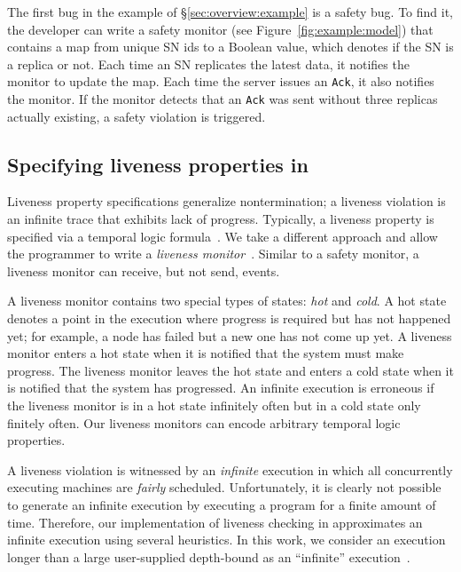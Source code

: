 The first bug in the example of \S\ref{sec:overview:example} is a safety bug. To find it, the developer can write a safety monitor (see Figure~\ref{fig:example:model}) that contains a map from unique SN ids to a Boolean value, which denotes if the SN is a replica or not. Each time an SN replicates the latest data, it notifies the monitor to update the map. Each time the server issues an \texttt{Ack}, it also notifies the monitor. If the monitor detects that an \texttt{Ack} was sent without three replicas actually existing, a safety violation is triggered.

\vspace{-1mm}
\subsection{Specifying liveness properties in \psharp}
\label{sec:overview:liveness}

Liveness property specifications generalize nontermination; a liveness violation is an infinite trace that exhibits lack of progress. Typically, a liveness property is specified via a temporal logic formula~\cite{Pnueli1977, lamport1994temporal}. We take a different approach and allow the programmer to write a \emph{liveness monitor}~\cite{desai2015building}. Similar to a safety monitor, a liveness monitor can receive, but not send, events.

A liveness monitor contains two special types of states: \emph{hot} and \emph{cold}. A hot state denotes a point in the execution where progress is required but has not happened yet; for example, a node has failed but a new one has not come up yet. A liveness monitor enters a hot state when it is notified that the system must make progress. The liveness monitor leaves the hot state and enters a cold state when it is notified that the system has progressed. An infinite execution is erroneous if the liveness monitor is in a hot state infinitely often but in a cold state only finitely often. Our liveness monitors can encode arbitrary temporal logic properties.

A liveness violation is witnessed by an \emph{infinite} execution in which all concurrently executing \psharp machines are \emph{fairly} scheduled. Unfortunately, it is clearly not possible to generate an infinite execution by executing a program for a finite amount of time. Therefore, our implementation of liveness checking in \psharp approximates an infinite execution using several heuristics. In this work, we consider an execution longer than a large user-supplied depth-bound as an ``infinite'' execution~\cite{killian2007life, musuvathi2008fair}.

